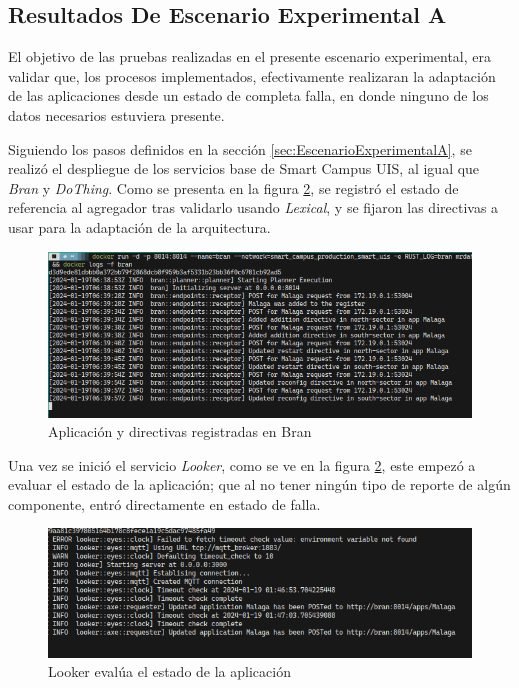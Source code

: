 \subsection{Resultados De Escenario Experimental A}

El objetivo de las pruebas realizadas en el presente escenario experimental, era validar que, los procesos implementados, efectivamente realizaran la adaptación de las aplicaciones desde un estado de completa falla, en donde ninguno de los datos necesarios estuviera presente.

Siguiendo los pasos definidos en la sección \ref{sec:EscenarioExperimentalA}, se realizó el despliegue de los servicios base de Smart Campus UIS, al igual que \textit{Bran} y \textit{DoThing}. Como se presenta en la figura \ref{fig:LookerStart}, se registró el estado de referencia al agregador tras validarlo usando \textit{Lexical}, y se fijaron las directivas a usar para la adaptación de la arquitectura.

\begin{figure}[H]
    \centering
    \caption{Aplicación y directivas registradas en Bran}
    \label{fig:BranStart}
    \includegraphics[width=\linewidth]{images/BranStart.png}
    \vspace{-4mm}
\end{figure}

Una vez se inició el servicio \textit{Looker}, como se ve en la figura \ref{fig:LookerStart}, este empezó a evaluar el estado de la aplicación; que al no tener ningún tipo de reporte de algún componente, entró directamente en estado de falla. 

\begin{figure}[H]
    \centering
    \caption{Looker evalúa el estado de la aplicación}
    \label{fig:LookerStart}
    \includegraphics[width=\linewidth]{images/LookerStart.png}
    \vspace{-4mm}
\end{figure}

